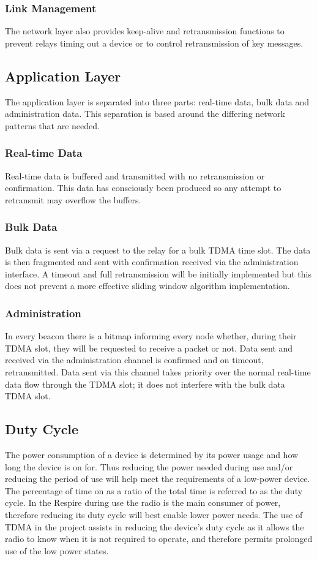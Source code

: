 \subsubsection{Link Management}
The network layer also provides keep-alive and retransmission functions to prevent relays timing out
a device or to control retransmission of key messages.


\subsection{Application Layer}
The application layer is separated into three parts: real-time data, bulk data and administration data.
This separation is based around the differing network patterns that are needed.

\subsubsection{Real-time Data}
Real-time data is buffered and transmitted with no retransmission or confirmation. This data has
consciously been produced so any attempt to retransmit may overflow the buffers.

\subsubsection{Bulk Data}
Bulk data is sent via a request to the relay for a bulk TDMA time slot. The data is then fragmented
and sent with confirmation received via the administration interface. A timeout and full
retransmission will be initially implemented but this does not prevent a more effective sliding
window algorithm implementation.

\subsubsection{Administration}
In every beacon there is a bitmap informing every node whether, during their TDMA slot, they will
be requested to receive a packet or not. Data sent and received via the administration channel is
confirmed and on timeout, retransmitted. Data sent via this channel takes priority over the normal
real-time data flow through the TDMA slot; it does not interfere with the bulk data TDMA slot.


\subsection{Duty Cycle}
The power consumption of a device is determined by its power usage and how long the device is on
for. Thus reducing the power needed during use and/or reducing the period of use will help meet
the requirements of a low-power device. The percentage of time on as a ratio of the total time is
referred to as the duty cycle. In the Respire during use the radio is the main consumer of power,
therefore reducing its duty cycle will best enable lower power needs. The use of TDMA in the project
assists in reducing the device’s duty cycle as it allows the radio to know when it is not required to
operate, and therefore permits prolonged use of the low power states.


